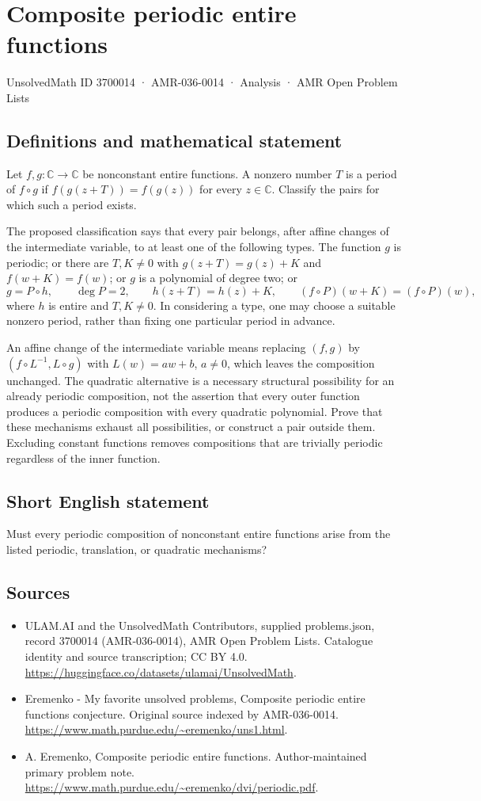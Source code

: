 \documentclass[11pt,a4paper]{article}
\begin{document}
\section*{Composite periodic entire functions}\label{3700014}
{\small UnsolvedMath ID 3700014 · AMR-036-0014 · Analysis · AMR Open Problem Lists}
\subsection{Definitions and mathematical statement}
Let $f,g:\mathbb C\to\mathbb C$ be nonconstant entire
functions. A nonzero number $T$ is a period of $f\circ g$
if $f(g(z+T))=f(g(z))$ for every $z\in\mathbb C$.
Classify the pairs for which such a period exists.

The proposed classification says that every pair belongs,
after affine changes of the intermediate variable, to at
least one of the following types. The function $g$ is
periodic; or there are $T,K\ne0$ with
$g(z+T)=g(z)+K$ and $f(w+K)=f(w)$; or $g$ is a
polynomial of degree two; or
\[
 g=P\circ h,\qquad \deg P=2,\qquad
 h(z+T)=h(z)+K,\qquad
 (f\circ P)(w+K)=(f\circ P)(w),
\]
where $h$ is entire and $T,K\ne0$.
In considering a type, one may choose a suitable nonzero
period, rather than fixing one particular period in advance.

An affine change of the intermediate variable means replacing
$(f,g)$ by $(f\circ L^{-1},L\circ g)$ with
$L(w)=aw+b$, $a\ne0$, which leaves the composition unchanged.
The quadratic alternative is a necessary structural
possibility for an already periodic composition, not the
assertion that every outer function produces a periodic
composition with every quadratic polynomial.
Prove that these mechanisms exhaust all possibilities,
or construct a pair outside them. Excluding constant
functions removes compositions that are trivially periodic
regardless of the inner function.
\subsection{Short English statement}
Must every periodic composition of nonconstant entire functions arise from the listed periodic, translation, or quadratic mechanisms?
\subsection{Sources}
\begin{itemize}
\item[S1] ULAM.AI and the UnsolvedMath Contributors, supplied problems.json, record 3700014 (AMR-036-0014), AMR Open Problem Lists. Catalogue identity and source transcription; CC BY 4.0.
\url{https://huggingface.co/datasets/ulamai/UnsolvedMath}.
\item[S2] Eremenko - My favorite unsolved problems, Composite periodic entire functions conjecture. Original source indexed by AMR-036-0014.
\url{https://www.math.purdue.edu/~eremenko/uns1.html}.
\item[S3] A. Eremenko, Composite periodic entire functions. Author-maintained primary problem note.
\url{https://www.math.purdue.edu/~eremenko/dvi/periodic.pdf}.
\end{itemize}
\end{document}
